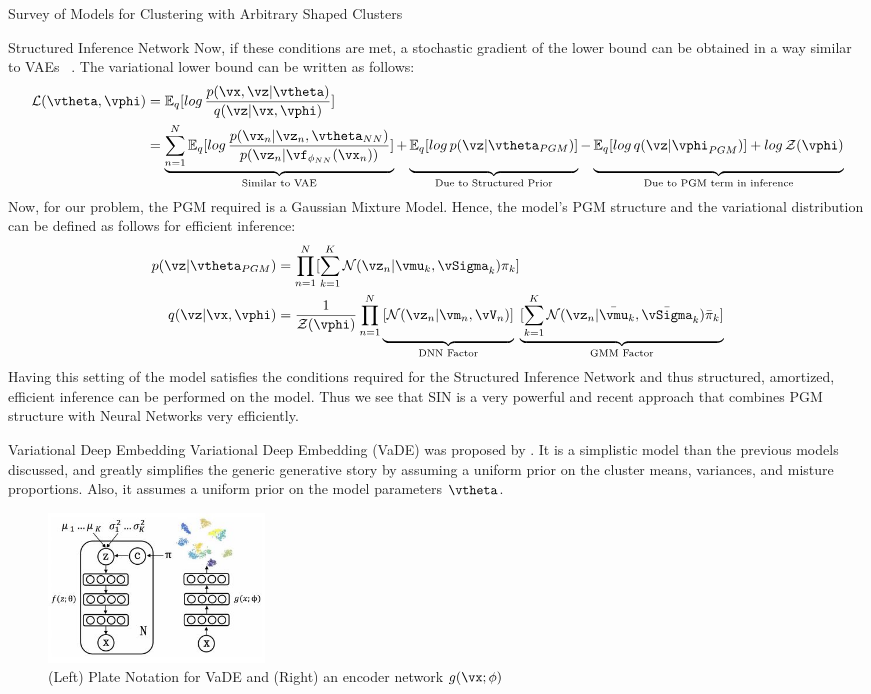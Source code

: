 \documentclass{article}
\begin{document}
\begin{psection}{Survey of Models for Clustering with Arbitrary Shaped Clusters}
\begin{psubsection}{Structured Inference Network}
		Now, if these conditions are met, a stochastic gradient of the lower bound can be obtained in a way similar to VAEs ~\citep{VAE}. The variational lower bound can be written as follows:
		\begin{align*}
			\mathcal{L}(\vtheta,\vphi) &= \mathbb{E}_q[log\, \frac{p(\vx,\vz|\vtheta)}{q(\vz|\vx,\vphi)}] \\
			&= \underbrace{\sum_{n=1}^N \mathbb{E}_q[log\,\frac{p(\vx_n|\vz_n,\vtheta_{NN})}{p(\vz_n|\vf_{\phi_{NN}}(\vx_n))}]}_\text{Similar to VAE} + \underbrace{\vphantom{\sum_{n=1}^N}\mathbb{E}_q[log\,p(\vz|\vtheta_{PGM})]}_\text{Due to Structured Prior} - \underbrace{\vphantom{\sum_{n=1}^N}\mathbb{E}_q[log\,q(\vz|\vphi_{PGM})] + log\,\mathcal{Z}(\vphi)}_\text{Due to PGM term in inference}
		\end{align*}
		Now, for our problem, the PGM required is a Gaussian Mixture Model. Hence, the model's PGM structure and the variational distribution can be defined as follows for efficient inference:
		\begin{align*}
			p(\vz|\vtheta_{PGM}) &= \prod_{n=1}^N [\sum_{k=1}^K \mathcal{N}(\vz_n|\vmu_k,\vSigma_k)\pi_k] \\
			q(\vz|\vx,\vphi) &= \frac{1}{\mathcal{Z}(\vphi)}\prod_{n=1}^N \underbrace{\vphantom{\sum_{k=1}^K}[\mathcal{N}(\vz_n|\vm_n,\vV_n)]}_\text{DNN Factor}\;\underbrace{[\sum_{k=1}^K \mathcal{N}(\vz_n|\Bar{\vmu}_k,\Bar{\vSigma}_k)\Bar{\pi}_k]}_\text{GMM Factor}
		\end{align*}
		Having this setting of the model satisfies the conditions required for the Structured Inference Network and thus structured, amortized, efficient inference can be performed on the model. Thus we see that SIN is a very powerful and recent approach that combines PGM structure with Neural Networks very efficiently.
	\end{psubsection}

	\begin{psubsection}{Variational Deep Embedding}
		Variational Deep Embedding (VaDE) was proposed by \cite{vade}. It is a simplistic model than the previous models discussed, and greatly simplifies the generic generative story by assuming a uniform prior on the cluster means, variances, and misture proportions. Also, it assumes a uniform prior on the model parameters $\vtheta$.

		\begin{figure}[h]
			\centering
			\includegraphics[height=150px]{includes/vade.jpg}
			\caption{(Left) Plate Notation for VaDE and (Right) an encoder network $g(\vx; \phi)$}
			\label{fig:my_label}
		\end{figure}


\end{psubsection}
\end{psection}
\end{document}
